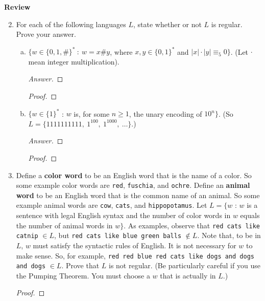 \documentclass[10pt]{article}
\newcommand{\card}[1]{\left| #1 \right|}
\begin{document}
\noindent
\textbf{Review}
\begin{enumerate}[1)]
\setcounter{enumi}{1}

\item
For each of the following languages $L$, state whether or not $L$ is regular. Prove your answer.
\begin{enumerate}[a)]
\item
$\{w \in \{0, 1, \#\}^*\ :\ w = x\#y$, where $x, y \in \{0, 1\}^*$ and $\card{x}\cdot \card{y} \equiv _5 0\}$.  (Let $\cdot$ mean integer multiplication).
\begin{proof}[Answer]
\end{proof}
\begin{proof}[Proof]
\end{proof}

\item
$\{w \in \{1\}^*$ : $w$ is, for some $n \geq 1$, the unary encoding of $10^n\}$.  (So $L = \{1111111111,\ 1^{100},\ 1^{1000},\ \ldots\}$.)
\begin{proof}[Answer]
\end{proof}
\begin{proof}[Proof]
\end{proof}
\end{enumerate}



\item
Define a \textbf{color word} to be an English word that is the name of a color.  So some example color words are \texttt{red}, \texttt{fuschia}, and \texttt{ochre}.  Define an \textbf{animal word} to be an English word that is the common name of an animal.  So some example animal words are \texttt{cow}, \texttt{cats}, and \texttt{hippopotamus}.  Let $L = \{w$ : $w$ is a sentence with legal English syntax and the number of color words in $w$ equals the number of animal words in $w\}$.  As examples, observe that \texttt{red cats like catnip} $\in L$, but \texttt{red cats like blue green balls} $\not \in L$.  Note that, to be in $L$, $w$ must satisfy the syntactic rules of English.  It is not necessary for $w$ to make sense.  So, for example, \texttt{red red blue red cats like dogs and dogs and dogs} $\in L$.  Prove that $L$ is not regular.  (Be particularly careful if you use the Pumping Theorem.  You must choose a $w$ that is actually in $L$.)
\begin{proof}[Proof]
\end{proof}




\end{enumerate}
\end{document}

